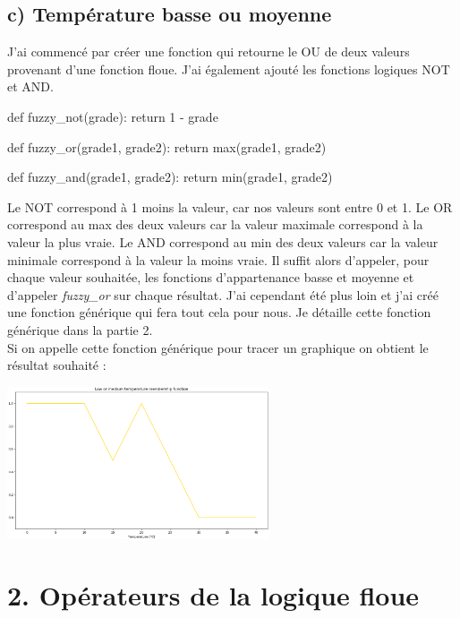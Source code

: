 \documentclass[11pt]{report}
\begin{document}
\subsection*{c) Température basse ou moyenne}

J'ai commencé par créer une fonction qui retourne le OU de deux valeurs provenant d'une fonction floue. J'ai également ajouté les fonctions logiques NOT et AND.
\begin{pythoncode}
def fuzzy_not(grade):
	return 1 - grade

def fuzzy_or(grade1, grade2):
	return max(grade1, grade2)

def fuzzy_and(grade1, grade2):
	return min(grade1, grade2)
\end{pythoncode}
Le NOT correspond à 1 moins la valeur, car nos valeurs sont entre 0 et 1.
Le OR correspond au max des deux valeurs car la valeur maximale correspond à la valeur la plus vraie.
Le AND correspond au min des deux valeurs car la valeur minimale correspond à la valeur la moins vraie.
Il suffit alors d'appeler, pour chaque valeur souhaitée, les fonctions d'appartenance basse et moyenne et d'appeler \textit{fuzzy\_or} sur chaque résultat. J'ai cependant été plus loin et j'ai créé une fonction générique qui fera tout cela pour nous. Je détaille cette fonction générique dans la partie 2.\\
Si on appelle cette fonction générique pour tracer un graphique on obtient le résultat souhaité :
\begin{center}
	\includegraphics[height=170px]{low_or_medium}
\end{center}

\section*{2. Opérateurs de la logique floue}
\end{document}
